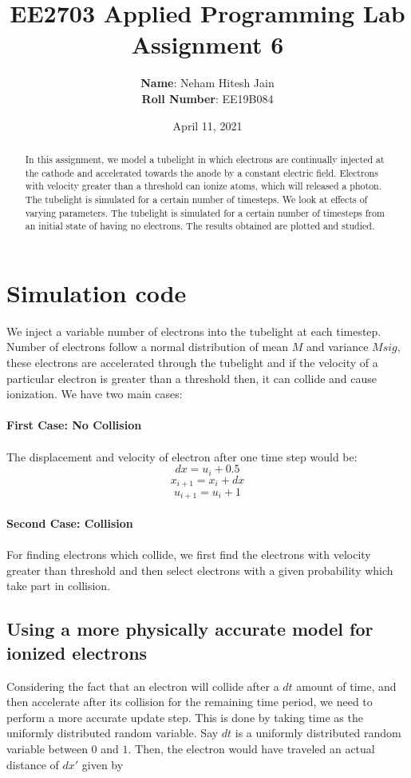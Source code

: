 \documentclass{article}
\title{EE2703 Applied Programming Lab \\ Assignment 6}
\author{
  \textbf{Name}: Neham Hitesh Jain\\
  \textbf{Roll Number}: EE19B084
}\date{April 11, 2021}
\begin{document}
\maketitle
\newpage

\begin{abstract}
In this assignment, we model a tubelight in which electrons are continually injected at the cathode and accelerated 
towards the anode by a constant electric field. Electrons with velocity greater than a threshold can ionize atoms, 
which will released a photon. The tubelight is simulated for a certain number of timesteps. We look at effects of varying parameters.
The tubelight is simulated for a certain number of timesteps from an initial state of having no electrons. 
The results obtained are plotted and studied.
\end{abstract}

\section{Simulation code}
We inject a variable number of electrons into the tubelight at each timestep.
Number of electrons follow a normal distribution of mean $M$ and variance $Msig$, 
these electrons are accelerated through the tubelight and if the velocity of a particular 
electron is greater than a threshold then, it can collide and cause ionization. 
We have two main cases:
\\\\
\textbf{First Case: No Collision} \\\\
The displacement and velocity of electron after one time step would be:
\[
dx = u_i + 0.5
\]
\[
x_{i+1} = x_i + dx
\]
\[
u_{i+1} = u_i + 1
\]\\
\textbf{Second Case: Collision} \\\\
For finding electrons which collide, we first find the electrons with velocity greater than threshold and 
then select electrons with a given probability which take part in collision. 

\subsection{Using a more physically accurate model for ionized electrons}

Considering the fact that an electron will collide after a
\(dt\) amount of time, and then accelerate after its collision for the
remaining time period, we need to perform a more accurate update step.
This is done by taking time as the uniformly distributed random
variable. Say \(dt\) is a uniformly distributed random variable between
\(0\) and \(1\). Then, the electron would have traveled an actual
distance of \(dx'\) given by
\end{document}
